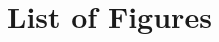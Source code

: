 \documentclass[conf]{new-aiaa}
\begin{document}
{\begin{longtable*}{@{}l @{\quad=\quad} l@{}}
\end{longtable*}}

\section{List of Figures}
\end{document}
